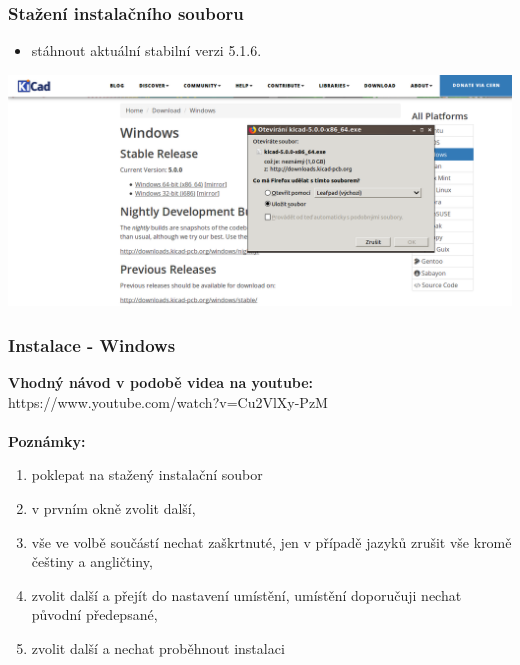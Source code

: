 \documentclass{beamer}
\newcommand{\kicadVersion}{5.1.6.}
\begin{document}
	\begin{frame}
    \frametitle{Stažení instalačního souboru}
		\small
		\begin{itemize}
			\item stáhnout aktuální stabilní verzi \kicadVersion\
		\end{itemize}
		
		\begin{center}
			\includegraphics[scale=0.3]{obr/kicad_stbv.png}
		\end{center}
	\end{frame}
	\begin{frame}
    \frametitle{Instalace - Windows}
    	\textbf{Vhodný návod v podobě videa na youtube:} https://www.youtube.com/watch?v=Cu2VlXy-PzM \\~\\
    	
    	\textbf{Poznámky:}
		\begin{enumerate}
			\item poklepat na stažený instalační soubor
			\item v prvním okně zvolit další,
			\item vše ve volbě součástí nechat zaškrtnuté, jen v případě jazyků zrušit vše kromě češtiny a angličtiny,
			\item zvolit další a přejít do nastavení umístění, umístění doporučuji nechat původní předepsané,
			\item zvolit další a nechat proběhnout instalaci
		\end{enumerate}
	\end{frame}
\end{document}
